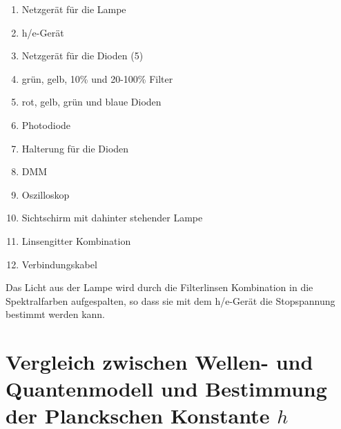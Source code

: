 \documentclass[12px]{scrartcl}
\begin{document}
\begin{enumerate}
\item	Netzgerät für die Lampe

\item	h/e-Gerät

\item	Netzgerät für die Dioden (5)

\item	grün, gelb, 10\% und 20-100\% Filter

\item	rot, gelb, grün und blaue Dioden

\item	Photodiode

\item	Halterung für die Dioden

\item	DMM

\item	Oszilloskop

\item	Sichtschirm mit dahinter stehender Lampe

\item	Linsengitter Kombination

\item	Verbindungskabel
\end{enumerate}

Das Licht aus der Lampe wird durch die Filterlinsen Kombination in die Spektralfarben aufgespalten, so dass sie mit dem h/e-Gerät die Stopspannung bestimmt werden kann.


\section{Vergleich zwischen Wellen- und Quantenmodell und Bestimmung der Planckschen
Konstante $h$}
\end{document}
